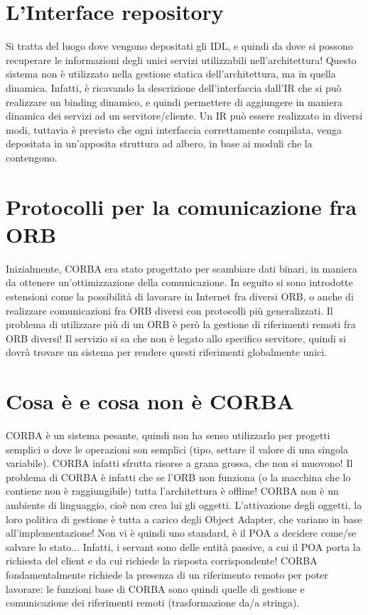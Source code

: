 \section{L'Interface repository}
Si tratta del luogo dove vengono depositati gli IDL, e quindi da dove si possono recuperare le informazioni degli unici
servizi utilizzabili nell'architettura!
Questo sistema non è utilizzato nella gestione statica dell'architettura, ma in quella dinamica. Infatti, è ricavando
la descrizione dell'interfaccia dall'IR che si può realizzare un binding dinamico, e quindi permettere di aggiungere in maniera dinamica dei
servizi ad un servitore/cliente.
Un IR può essere realizzato in diversi modi, tuttavia è previsto che ogni interfaccia correttamente compilata, venga depositata in un'apposita struttura ad albero, in base ai moduli che la contengono.
\section{Protocolli per la comunicazione fra ORB}
Inizialmente, CORBA era stato progettato per scambiare dati binari, in maniera da ottenere un'ottimizzazione della
comunicazione. In seguito si sono introdotte estensioni come la possibilità di lavorare in Internet fra diversi ORB, o
anche di realizzare comunicazioni fra ORB diversi con protocolli più generalizzati.
Il problema di utilizzare più di un ORB è però la gestione di riferimenti remoti fra ORB diversi! Il servizio si sa
che non è legato allo specifico servitore, quindi si dovrà trovare un sistema per rendere questi riferimenti
globalmente unici.
\section{Cosa è e cosa non è CORBA}
CORBA è un sistema pesante, quindi non ha senso utilizzarlo per progetti semplici o dove le operazioni son semplici
(tipo, settare il valore di una singola variabile). CORBA infatti sfrutta risorse a grana grossa, che non si muovono!
Il problema di CORBA è infatti che se l'ORB non funziona (o la macchina che lo contiene non è raggiungibile) tutta
l'architettura è offline!
CORBA non è un ambiente di linguaggio, cioè non crea lui gli oggetti. L'attivazione degli oggetti, la loro politica di
gestione è tutta a carico degli Object Adapter, che variano in base all'implementazione! Non vi è quindi uno standard, è
il POA a decidere come/se salvare lo stato... Infatti, i servant sono delle entità passive, a cui il POA porta la
richiesta del client e da cui richiede la risposta corrispondente!
CORBA fondamentalmente richiede la presenza di un riferimento remoto per poter lavorare: le funzioni base di CORBA sono
quindi quelle di gestione e comunicazione dei riferimenti remoti (trasformazione da/a stringa).
